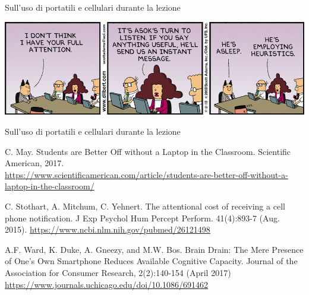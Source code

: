 \begin{frame}{Sull'uso di portatili e cellulari durante la lezione}
	
\vspace{-6pt}
\begin{center}
\includegraphics[width=1.0\textwidth]{attention.png}
\end{center}

\end{frame}

\begin{frame}{Sull'uso di portatili e cellulari durante la lezione}

\footnotesize
\BIL
\item C. May. \alert{Students are Better Off without a Laptop in the Classroom}. Scientific American, 2017.\\
\url{https://www.scientificamerican.com/article/students-are-better-off-without-a-laptop-in-the-classroom/}

\item C. Stothart, A. Mitchum, C. Yehnert. \alert{The attentional cost of receiving a cell phone notification}. J Exp Psychol Hum Percept Perform. 41(4):893-7 (Aug. 2015).
\url{https://www.ncbi.nlm.nih.gov/pubmed/26121498}

\item A.F. Ward, K. Duke, A. Gneezy, and M.W. Bos. 
\alert{Brain Drain: The Mere Presence of One’s Own Smartphone Reduces Available Cognitive Capacity}. 
Journal of the Association for Consumer Research, 2(2):140-154 (April 2017) \\
\url{https://www.journals.uchicago.edu/doi/10.1086/691462}

\EIL

\end{frame}

